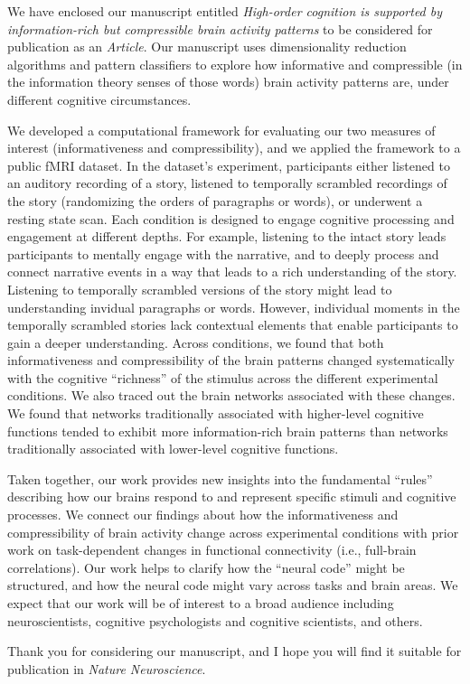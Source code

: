 \documentclass[10pt,stdletter,orderfromtodate,sigleft]{newlfm}
\newcommand{\journal}{Nature Neuroscience}
\newcommand{\articletype}{Article}
\newcommand{\myTitle}{High-order cognition is supported by information-rich but compressible brain activity patterns}
\begin{document}
\begin{newlfm}

  We have enclosed our manuscript entitled \textit{\myTitle} to be considered
  for publication as an \textit{\articletype}. Our manuscript uses
  dimensionality reduction algorithms and pattern classifiers to explore how
  informative and compressible (in the information theory senses of those
  words) brain activity patterns are, under different cognitive circumstances.

  We developed a computational framework for evaluating our two measures of
  interest (informativeness and compressibility), and we applied the framework
  to a public fMRI dataset. In the dataset's experiment, participants either
  listened to an auditory recording of a story, listened to temporally
  scrambled recordings of the story (randomizing the orders of paragraphs or
  words), or underwent a resting state scan. Each condition is designed to
  engage cognitive processing and engagement at different depths. For example,
  listening to the intact story leads participants to mentally engage with the
  narrative, and to deeply process and connect narrative events in a way that
  leads to a rich understanding of the story. Listening to temporally scrambled
  versions of the story might lead to understanding invidual paragraphs or
  words. However, individual moments in the temporally scrambled stories lack
  contextual elements that enable participants to gain a deeper understanding.
  Across conditions, we found that both informativeness and compressibility of
  the brain patterns changed systematically with the cognitive ``richness'' of
  the stimulus across the different experimental conditions. We also traced out
  the brain networks associated with these changes. We found that networks
  traditionally associated with higher-level cognitive functions tended to
  exhibit more information-rich brain patterns than networks traditionally
  associated with lower-level cognitive functions.

  Taken together, our work provides new insights into the fundamental ``rules''
  describing how our brains respond to and represent specific stimuli and
  cognitive processes. We connect our findings about how the informativeness
  and compressibility of brain activity change across experimental conditions
  with prior work on task-dependent changes in functional connectivity (i.e.,
  full-brain correlations). Our work helps to clarify how the ``neural code''
  might be structured, and how the neural code might vary across tasks and
  brain areas. We expect that our work will be of interest to a broad audience
  including neuroscientists, cognitive psychologists and cognitive scientists,
  and others.


Thank you for considering our manuscript, and I hope you will find it suitable
for publication in \textit{\journal}.


\end{newlfm}
\end{document}
